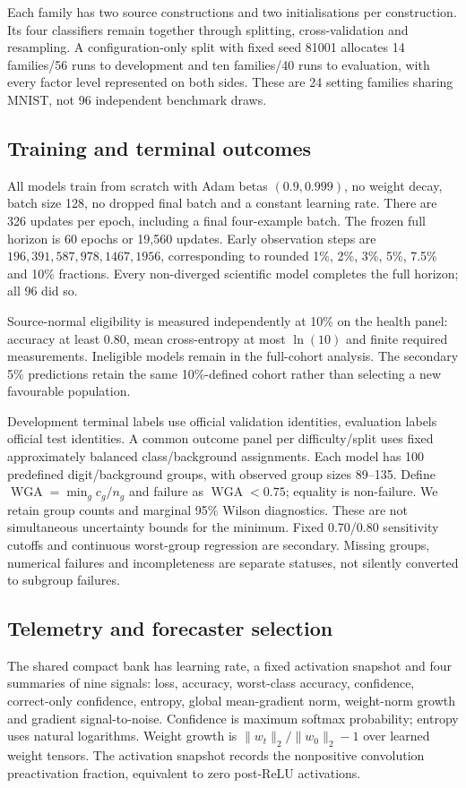 Each family has two source constructions and two initialisations per construction. Its four classifiers remain together through splitting, cross-validation and resampling. A configuration-only split with fixed seed 81001 allocates 14 families/56 runs to development and ten families/40 runs to evaluation, with every factor level represented on both sides. These are 24 setting families sharing MNIST, not 96 independent benchmark draws.

\subsection{Training and terminal outcomes}
All models train from scratch with Adam betas $(0.9,0.999)$, no weight decay, batch size 128, no dropped final batch and a constant learning rate. There are 326 updates per epoch, including a final four-example batch. The frozen full horizon is 60 epochs or 19,560 updates. Early observation steps are $196,391,587,978,1467,1956$, corresponding to rounded 1\%, 2\%, 3\%, 5\%, 7.5\% and 10\% fractions. Every non-diverged scientific model completes the full horizon; all 96 did so.

Source-normal eligibility is measured independently at 10\% on the health panel: accuracy at least $0.80$, mean cross-entropy at most $\ln(10)$ and finite required measurements. Ineligible models remain in the full-cohort analysis. The secondary 5\% predictions retain the same 10\%-defined cohort rather than selecting a new favourable population.

Development terminal labels use official validation identities, evaluation labels official test identities. A common outcome panel per difficulty/split uses fixed approximately balanced class/background assignments. Each model has 100 predefined digit/background groups, with observed group sizes 89--135. Define $\operatorname{WGA}=\min_g c_g/n_g$ and failure as $\operatorname{WGA}<0.75$; equality is non-failure. We retain group counts and marginal 95\% Wilson diagnostics. These are not simultaneous uncertainty bounds for the minimum. Fixed 0.70/0.80 sensitivity cutoffs and continuous worst-group regression are secondary. Missing groups, numerical failures and incompleteness are separate statuses, not silently converted to subgroup failures.

\subsection{Telemetry and forecaster selection}
The shared compact bank has learning rate, a fixed activation snapshot and four summaries of nine signals: loss, accuracy, worst-class accuracy, confidence, correct-only confidence, entropy, global mean-gradient norm, weight-norm growth and gradient signal-to-noise. Confidence is maximum softmax probability; entropy uses natural logarithms. Weight growth is $\|w_t\|_2/\|w_0\|_2-1$ over learned weight tensors. The activation snapshot records the nonpositive convolution preactivation fraction, equivalent to zero post-ReLU activations.

